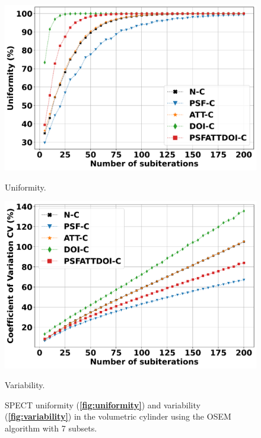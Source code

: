 \documentclass[utf8]{FrontiersinHarvard} %
\begin{document}
\begin{subfigure}
    \centering
    	\setcounter{figure}{4}
	\setcounter{subfigure}{0}
    \begin{minipage}[b]{0.5\textwidth}
        \includegraphics[width=\linewidth]{Figures/VSAC_Uniformity.pdf}
        \caption{Uniformity.}
        \label{fig:uniformity}
    \end{minipage}  
   
	\setcounter{figure}{4}
	\setcounter{subfigure}{1}
    \begin{minipage}[b]{0.5\textwidth}
        \includegraphics[width=\linewidth]{Figures/VSAC_CV.pdf}
        \caption{Variability.}
        \label{fig:variability}
    \end{minipage}
    
\setcounter{figure}{4}
\setcounter{subfigure}{-1}
\caption{SPECT uniformity (\textbf{\ref{fig:uniformity}}) and variability (\textbf{\ref{fig:variability}}) in the volumetric cylinder using the OSEM algorithm with 7 subsets.}\label{fig:uniformity_variability}
\end{subfigure}
\end{document}

